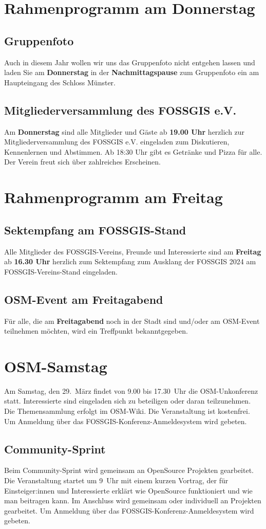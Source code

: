 \section*{Rahmenprogramm am Donnerstag}
\subsection*{Gruppenfoto}
Auch in diesem Jahr wollen wir uns das Gruppenfoto nicht entgehen lassen und laden Sie am {\bfseries Donnerstag} in der {\bfseries Nachmittagspause} zum Gruppenfoto ein am Haupteingang des Schloss Münster.

\subsection*{Mitgliederversammlung des FOSSGIS e.V.}
Am {\bfseries Donnerstag} sind alle Mitglieder und Gäste ab {\bfseries 19.00 Uhr} herzlich zur Mitgliederversammlung des FOSSGIS e.V. eingeladen zum Diskutieren, Kennenlernen und Abstimmen. Ab 18:30 Uhr
gibt es Getränke und Pizza für alle. Der Verein freut sich über zahlreiches Erscheinen.

\section*{Rahmenprogramm am Freitag}

\subsection*{Sektempfang am FOSSGIS-Stand}
Alle Mitglieder des FOSSGIS-Vereins, Freunde und Interessierte sind am {\bfseries Freitag} ab {\bfseries 16.30 Uhr} herzlich zum Sektempfang zum Ausklang der FOSSGIS 2024 am FOSSGIS-Vereins-Stand eingeladen.

\subsection*{OSM-Event am Freitagabend}
Für alle, die am {\bfseries Freitagabend} noch in der Stadt sind und/oder am OSM-Event teilnehmen möchten, wird ein Treffpunkt bekanntgegeben.

\pagebreak
\section*{OSM-Samstag}
Am Samstag, den 29.~März findet von 9.00 bis 17.30~Uhr die OSM-Unkonferenz statt.
Interessierte sind eingeladen sich zu beteiligen oder daran teilzunehmen.
Die Themensammlung erfolgt im OSM-Wiki. Die Veranstaltung ist kostenfrei.
Um Anmeldung über das FOSSGIS-Konferenz-Anmeldesystem wird gebeten.

\subsection*{Community-Sprint}
Beim Community-Sprint wird gemeinsam an OpenSource Projekten gearbeitet.
Die Veranstaltung startet um 9~Uhr mit einem kurzen Vortrag, der für Einsteiger:innen
und Interessierte erklärt wie OpenSource funktioniert und wie man beitragen kann.
Im Anschluss wird gemeinsam oder individuell an Projekten gearbeitet.
Um Anmeldung über das FOSSGIS-Konferenz-Anmeldesystem wird gebeten.
